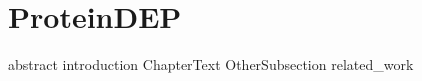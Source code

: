 \chapter{ProteinDEP}
\label{ProteinDEP}

{abstract}
{introduction}
{ChapterText}
{OtherSubsection}
{related_work}